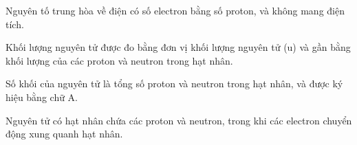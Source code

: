 \begin{loigiaiex}{33}
  Nguyên tố trung hòa về điện có số electron bằng số proton, và không mang điện tích.  \phantom {a}\hfill { \faKey ~\writeANS }
\end{loigiaiex}
\def\writeANS{\TLdung{A}\TLsai{B}\TLdung{C}\TLsai{D}}
\begin{loigiaiex}{34}
  Khối lượng nguyên tử được đo bằng đơn vị khối lượng nguyên tử (u) và gần bằng khối lượng của các proton và neutron trong hạt nhân.  \phantom {a}\hfill { \faKey ~\writeANS }
\end{loigiaiex}
\def\writeANS{\TLsai{A}\TLdung{B}\TLsai{C}\TLdung{D}}
\begin{loigiaiex}{35}
  Số khối của nguyên tử là tổng số proton và neutron trong hạt nhân, và được ký hiệu bằng chữ A.  \phantom {a}\hfill { \faKey ~\writeANS }
\end{loigiaiex}
\def\writeANS{\TLdung{C}\TLsai{D}}
\begin{loigiaiex}{36}
  Nguyên tử có hạt nhân chứa các proton và neutron, trong khi các electron chuyển động xung quanh hạt nhân.  \phantom {a}\hfill { \faKey ~\writeANS }
\end{loigiaiex}
